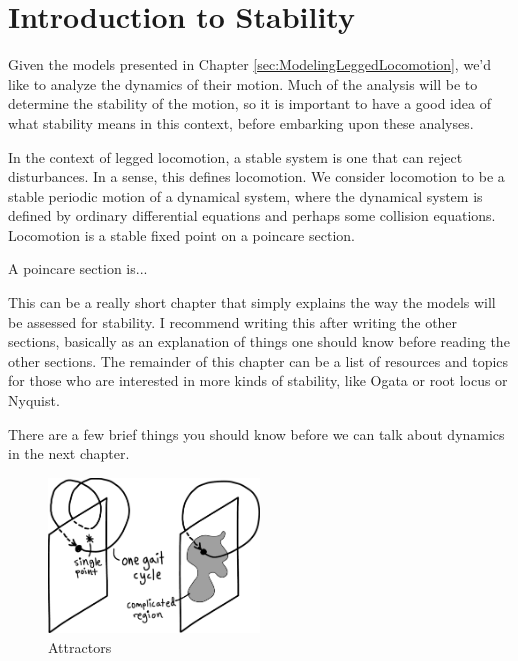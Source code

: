 \chapter{Introduction to Stability} %
\label{sec:IntroductionToStability}

Given the models presented in Chapter \ref{sec:ModelingLeggedLocomotion}, we'd like to analyze the dynamics of their motion. Much of the analysis will be to determine the stability of the motion, so it is important to have a good idea of what stability means in this context, before embarking upon these analyses. 

In the context of legged locomotion, a stable system is one that can reject disturbances. In a sense, this defines locomotion. We consider locomotion to be a stable periodic motion of a dynamical system, where the dynamical system is defined by ordinary differential equations and perhaps some collision equations. Locomotion is a stable fixed point on a poincare section. 

A poincare section is...



This can be a really short chapter that simply explains the way the models will be assessed for stability. I recommend writing this after writing the other sections, basically as an explanation of things one should know before reading the other sections. The remainder of this chapter can be a list of resources and topics for those who are interested in more kinds of stability, like Ogata or root locus or Nyquist.

There are a few brief things you should know before we can talk about dynamics in the next chapter.

\begin{figure}[h]		%
\begin{centering}
\includegraphics[width=0.5\textwidth]{Figures/Attractors}\par
\end{centering}
\caption{Attractors}
\label{fig:Attractors}
\end{figure}
%

